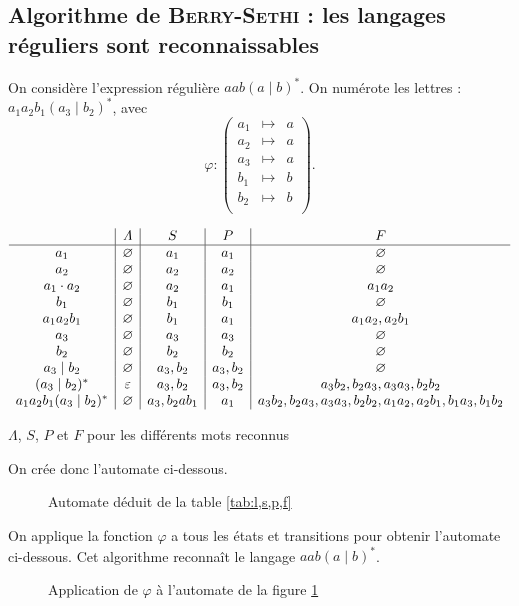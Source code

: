 \subsection{Algorithme de {\scshape Berry-Sethi}\/ : les langages réguliers sont reconnaissables}

\begin{exm}
	On considère l'expression régulière $aab(a \mid b)^*$. On numérote les lettres : $a_1a_2b_1(a_3 \mid b_2)^*$, avec  \[
		\varphi : \left(
			\begin{array}{ccc}
				a_1&\mapsto&a\\
				a_2&\mapsto&a\\
				a_3&\mapsto&a\\
				b_1&\mapsto&b\\
				b_2&\mapsto&b\\
			\end{array}
		\right)
	.\]

	\begin{table}[H]
		\centering
		\[
			\begin{array}{c|c|c|c|c}
				&\varLambda&S&P&F\\\hline
				a_1&\varnothing&a_1&a_1&\varnothing\\
				a_2&\varnothing&a_2&a_2&\varnothing\\
				a_1\cdot a_2&\varnothing&a_2&a_1&a_1a_2\\
				b_1&\varnothing&b_1&b_1&\varnothing\\
				a_1a_2b_1&\varnothing&b_1&a_1&a_1a_2,a_2b_1\\
				a_3&\varnothing&a_3&a_3&\varnothing\\
				b_2&\varnothing&b_2&b_2&\varnothing\\
				a_3 \mid b_2&\varnothing&a_3,b_2&a_3,b_2&\varnothing\\
				(a_3 \mid b_2)^*&\varepsilon&a_3,b_2&a_3,b_2&a_3b_2,b_2a_3,a_3a_3,b_2b_2\\
				a_1a_2b_1(a_3 \mid b_2)^*&\varnothing&a_3,b_2ab_1&a_1&a_3b_2,b_2a_3,a_3a_3,b_2b_2,a_1a_2,a_2b_1,b_1a_3,b_1b_2
			\end{array}
		\]
		\caption{$\Lambda$, $S$, $P$\/ et $F$\/ pour les différents mots reconnus}
		\label{tab:l,s,p,f}
	\end{table}
	On crée donc l'automate ci-dessous.
	\begin{figure}[H]
		\centering
		\caption{Automate déduit de la table \ref{tab:l,s,p,f}}
		\label{aut:num}
	\end{figure}
	On applique la fonction $\varphi$\/ a tous les états et transitions pour obtenir l'automate ci-dessous. Cet algorithme reconnaît le langage $aab(a \mid b)^*$.
	\begin{figure}[H]
		\centering
		\caption{Application de $\varphi$\/ à l'automate de la figure \ref{aut:num}}
	\end{figure}
\end{exm}

